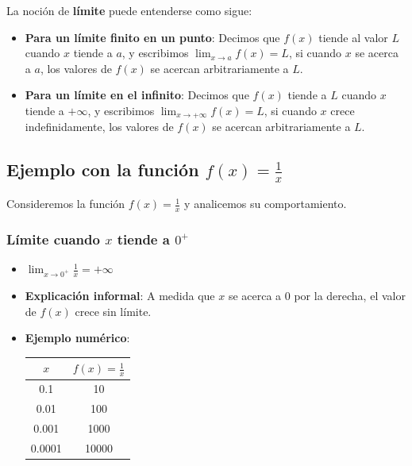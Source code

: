 \documentclass[12pt, a4paper]{article}
\theoremstyle{rioplatense}
\begin{document}

La noción de \textbf{límite} puede entenderse como sigue:

\begin{itemize}
    \item \textbf{Para un límite finito en un punto}: Decimos que $f(x)$ tiende al valor $L$ cuando $x$ tiende a $a$, y escribimos $\lim_{x \to a} f(x) = L$, si cuando $x$ se acerca a $a$, los valores de $f(x)$ se acercan arbitrariamente a $L$.

    \item \textbf{Para un límite en el infinito}: Decimos que $f(x)$ tiende a $L$ cuando $x$ tiende a $+\infty$, y escribimos $\lim_{x \to +\infty} f(x) = L$, si cuando $x$ crece indefinidamente, los valores de $f(x)$ se acercan arbitrariamente a $L$.
\end{itemize}

\subsection{Ejemplo con la función $f(x) = \frac{1}{x}$}

Consideremos la función $f(x) = \frac{1}{x}$ y analicemos su comportamiento.

\subsubsection{Límite cuando $x$ tiende a $0^+$}

\begin{itemize}
    \item  $\displaystyle \lim_{x \to 0^+} \frac{1}{x} = +\infty$

    \item \textbf{Explicación informal}: A medida que $x$ se acerca a $0$ por la derecha, el valor de $f(x)$ crece sin límite.

    \item \textbf{Ejemplo numérico}:
    \begin{center}
    \begin{tabular}{|c|c|}
    \hline
    $x$ & $f(x) = \frac{1}{x}$ \\ \hline
    0.1 & 10 \\ \hline
    0.01 & 100 \\ \hline
    0.001 & 1000 \\ \hline
    0.0001 & 10000 \\ \hline
    \end{tabular}
    \end{center}
\end{itemize}
\end{document}
